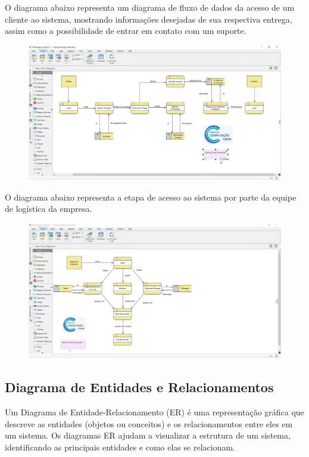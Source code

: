 	O diagrama abaixo representa um diagrama de fluxo de dados da acesso de um cliente ao sistema, mostrando informações desejadas de sua respectiva entrega, assim como a possibilidade de entrar em contato com um suporte.
\begin{figure}[H]
	\centering
	\includegraphics[width=1\linewidth]{"Pictures/Fluxo de Dados1"}
	\caption{}
	\label{fig:fluxo-de-dados1}
\end{figure}

	O diagrama abaixo representa a etapa de acesso ao sistema por parte da equipe de logística da empresa.
\begin{figure}[H]
	\centering
	\includegraphics[width=1\linewidth]{Pictures/Flux2}
	\caption{}
	\label{fig:flux2}
\end{figure}

    \subsection{Diagrama de Entidades e Relacionamentos}
	Um Diagrama de Entidade-Relacionamento (ER) é uma representação gráfica que descreve as entidades (objetos ou conceitos) e os relacionamentos entre eles em um sistema. Os diagramas ER ajudam a visualizar a estrutura de um sistema, identificando as principais entidades e como elas se relacionam.
	

